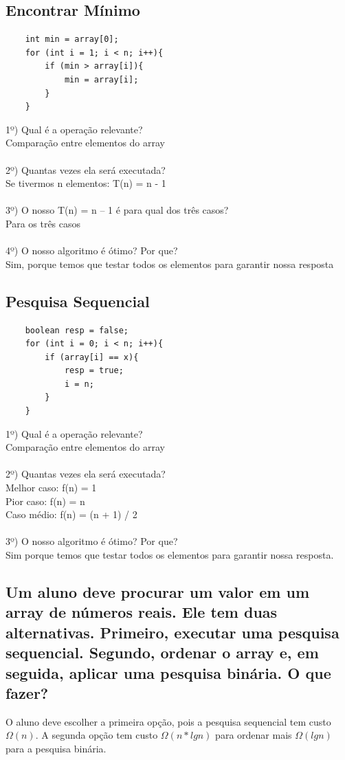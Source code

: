 \documentclass[12pt]{article}
\begin{document}
{\subsection{Encontrar Mínimo}
\begin{lstlisting}
    int min = array[0];
    for (int i = 1; i < n; i++){
        if (min > array[i]){
            min = array[i];
        }
    }
\end{lstlisting}
1º) Qual é a operação relevante?\\
Comparação entre elementos do array\\\\
2º) Quantas vezes ela será executada?\\
Se tivermos n elementos: T(n) = n - 1\\\\
3º) O nosso T(n) = n – 1 é para qual dos três casos?\\
Para os três casos\\\\
4º) O nosso algoritmo é ótimo? Por que?\\
Sim, porque temos que testar todos os elementos para garantir nossa resposta

\subsection{Pesquisa Sequencial}
\begin{lstlisting}
    boolean resp = false;
    for (int i = 0; i < n; i++){
        if (array[i] == x){
            resp = true;
            i = n;
        }
    }
\end{lstlisting}
1º) Qual é a operação relevante?\\
Comparação entre elementos do array\\\\
2º) Quantas vezes ela será executada?\\
Melhor caso: f(n) = 1
   \\Pior caso: f(n) = n
   \\Caso médio: f(n) = (n + 1) / 2\\\\
3º) O nosso algoritmo é ótimo? Por que?\\
Sim porque temos que testar todos os elementos para garantir nossa resposta.

\subsection{Um aluno deve procurar um valor em um array de números reais. Ele tem duas alternativas. Primeiro, executar uma pesquisa sequencial. Segundo, ordenar o array e, em seguida, aplicar uma pesquisa binária. O que fazer?}
O aluno deve escolher a primeira opção, pois a pesquisa sequencial tem custo $\Omega(n)$. A segunda opção tem custo $\Omega(n * lg n)$ para ordenar mais $\Omega(lg n)$ para a pesquisa binária.

}
\end{document}
